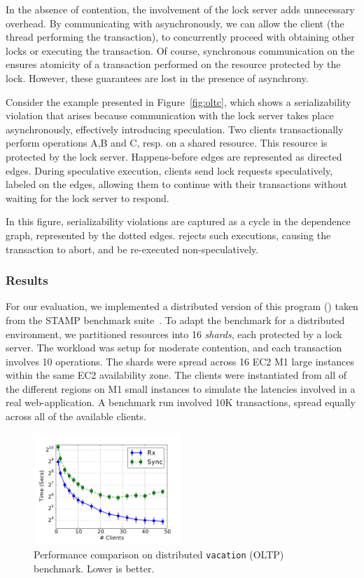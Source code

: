 In the absence of contention, the involvement of the lock server adds
unnecessary overhead.  By communicating with  asynchronously, we
can allow the client (the thread performing the transaction), to concurrently
proceed with obtaining other locks or executing the transaction.  Of course,
synchronous communication on the  ensures atomicity of a
transaction performed on the resource protected by the lock. However, these
guarantees are lost in the presence of asynchrony.

Consider the example presented in Figure~\ref{fig:oltc}, which shows a
serializability violation that arises because communication with the
lock server takes place asynchronously, effectively introducing speculation.
Two clients transactionally perform operations A,B and C, resp.  on a shared
resource. This resource is protected by the lock server.  Happens-before edges
are represented as directed edges. During speculative execution, clients send
lock requests speculatively, labeled  on the edges, allowing them to
continue with their transactions without waiting for the lock server to
respond.

In this figure, serializability violations are captured as a cycle in the
dependence graph, represented by the dotted edges. \rxcml rejects such
executions, causing the transaction to abort, and be re-executed
non-speculatively.

\subsubsection{Results}

For our evaluation, we implemented a distributed version of this program
() taken from the STAMP benchmark suite~\cite{STAMP}.  To adapt
the benchmark for a distributed environment, we partitioned resources into 16
\emph{shards}, each protected by a lock server.  The workload was setup for
moderate contention, and each transaction involves 10 operations. The shards
were spread across 16 EC2 M1 large instances within the same EC2 availability
zone. The clients were instantiated from all of the different regions on M1
small instances to simulate the latencies involved in a real web-application. A
benchmark run involved 10K transactions, spread equally across all of the
available clients.

\begin{figure}[t]
\centering
\includegraphics[width=0.5\textwidth]{Graphs/oltp_time}
\caption{Performance comparison on distributed \texttt{vacation} (OLTP)
benchmark. Lower is better.}
\label{grf:oltp}
\end{figure}

